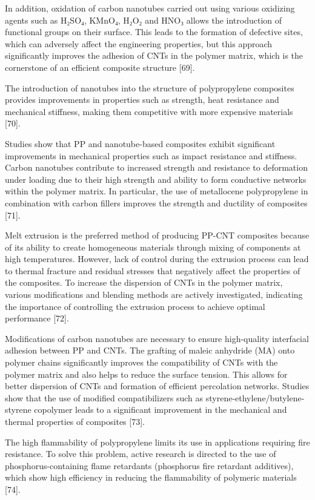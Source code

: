 \begin{multicols}{2}
In addition, oxidation of carbon nanotubes carried out using various
oxidizing agents such as H₂SO₄, KMnO₄, H₂O₂ and HNO₃ allows the
introduction of functional groups on their surface. This leads to the
formation of defective sites, which can adversely affect the engineering
properties, but this approach significantly improves the adhesion of
CNTs in the polymer matrix, which is the cornerstone of an efficient
composite structure {[}69{]}.

The introduction of nanotubes into the structure of polypropylene
composites provides improvements in properties such as strength, heat
resistance and mechanical stiffness, making them competitive with more
expensive materials {[}70{]}.

Studies show that PP and nanotube-based composites exhibit significant
improvements in mechanical properties such as impact resistance and
stiffness. Carbon nanotubes contribute to increased strength and
resistance to deformation under loading due to their high strength and
ability to form conductive networks within the polymer matrix. In
particular, the use of metallocene polypropylene in combination with
carbon fillers improves the strength and ductility of composites
{[}71{]}.

Melt extrusion is the preferred method of producing PP-CNT composites
because of its ability to create homogeneous materials through mixing of
components at high temperatures. However, lack of control during the
extrusion process can lead to thermal fracture and residual stresses
that negatively affect the properties of the composites. To increase the
dispersion of CNTs in the polymer matrix, various modifications and
blending methods are actively investigated, indicating the importance of
controlling the extrusion process to achieve optimal performance
{[}72{]}.

Modifications of carbon nanotubes are necessary to ensure high-quality
interfacial adhesion between PP and CNTs. The grafting of maleic
anhydride (MA) onto polymer chains significantly improves the
compatibility of CNTs with the polymer matrix and also helps to reduce
the surface tension. This allows for better dispersion of CNTs and
formation of efficient percolation networks. Studies show that the use
of modified compatibilizers such as styrene-ethylene/butylene-styrene
copolymer leads to a significant improvement in the mechanical and
thermal properties of composites {[}73{]}.

The high flammability of polypropylene limits its use in applications
requiring fire resistance. To solve this problem, active research is
directed to the use of phosphorus-containing flame retardants
(phosphorus fire retardant additives), which show high efficiency in
reducing the flammability of polymeric materials {[}74{]}.


\end{multicols}
